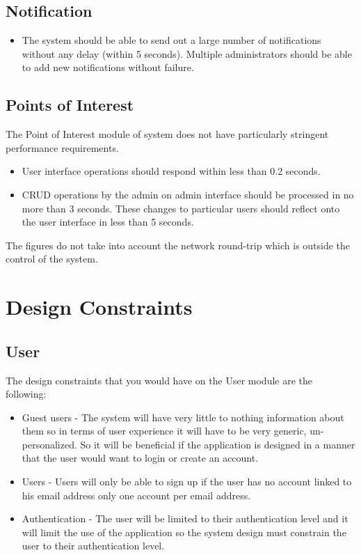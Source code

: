 \documentclass[runningheads,a4paper]{article}
\begin{document}
\subsection{Notification}
\begin{itemize}
\item The system should be able to send out a large number of notifications without any delay (within 5 seconds).
Multiple administrators should be able to add new notifications without failure.
\end{itemize}

\subsection{Points of Interest}
The Point of Interest module of system does not have particularly stringent performance requirements.

\begin{itemize}
\item User interface operations should respond within less than 0.2 seconds.

\item CRUD operations by the admin on admin interface should be processed in no more than 3 seconds. These changes to particular users should reflect onto the user interface in less than 5 seconds.
\end{itemize}

The figures do not take into account the network round-trip which is outside the control of the
system.

\section{Design Constraints}

\subsection{User}
	The design constraints that you would have on the User module are the following:
	\begin{itemize}
		\item Guest users - The system will have very little to nothing information about them so in terms of user experience it will have to be very generic, 					un-personalized. So it will be beneficial if the application is designed in a manner that the user would want to login or create an account.
		\item Users - Users will only be able to sign up if the user has no account linked to his email address only one account per email address.
		\item Authentication - The user will be limited to their authentication level and it will limit the use of the application so the system design must 						constrain the user to their authentication level.    
	\end{itemize}
\end{document}
